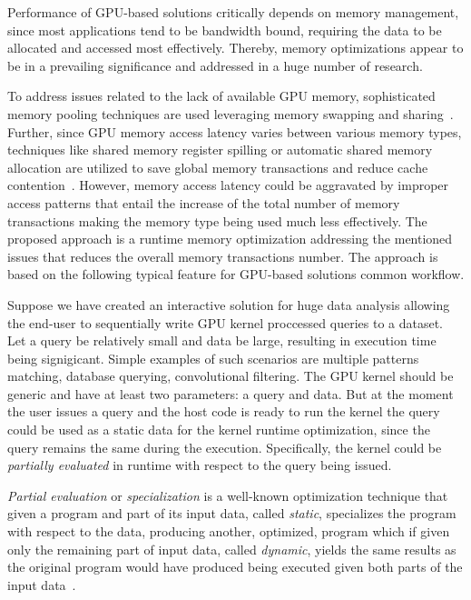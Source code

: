 \documentclass[sigplan]{acmart}\settopmatter{printacmref=false, printfolios=false}
\begin{document}
Performance of GPU-based solutions critically depends on memory management, since most applications tend to be bandwidth bound, requiring the data to be allocated and accessed most effectively.
Thereby, memory optimizations appear to be in a prevailing significance and addressed in a huge number of research.

To address issues related to the lack of available GPU memory, sophisticated memory pooling techniques are used leveraging memory swapping and sharing~\cite{zhang2019efficient}.
Further, since GPU memory access latency varies between various memory types, techniques like shared memory register spilling or automatic shared memory allocation are utilized to save global memory transactions and reduce cache contention~\cite{Sakdhnagool2019RegDemIG,Xie2018ICCADU}.
However, memory access latency could be aggravated by improper access patterns that entail the increase of the total number of memory transactions 
making the memory type being used much less effectively.
The proposed approach is a runtime memory optimization addressing the mentioned issues that reduces the overall memory transactions number.
The approach is based on the following typical feature for GPU-based solutions common workflow.

Suppose %
we have created an interactive solution for huge data analysis allowing the end-user to sequentially write GPU kernel proccessed queries to a dataset.
Let a query be relatively small and data be large, resulting in execution time being signigicant.
Simple examples of such scenarios are multiple patterns matching, database querying, convolutional filtering.
The GPU kernel should be generic and have at least two parameters: a query and data.
But at the moment the user issues a query and the host code is ready to run the kernel the query could be used as a static data for the kernel runtime optimization, since the query remains the same during the execution. 
Specifically, the kernel could be \emph{partially evaluated} in runtime with respect to the query being issued.

\textit{Partial evaluation} or \textit{specialization} is a well-known  optimization technique that given a program and part of its input data, called \emph{static}, specializes the program with respect to the data, producing another, optimized, program which if given only the remaining part of input data, called \emph{dynamic}, yields the same results as the original program would have produced being executed given both parts of the input data~\cite{Jones:1993:PEA:153676,PartialEvalPaper}.
\end{document}
